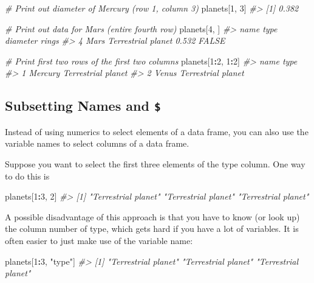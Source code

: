 \documentclass[]{book}
\newenvironment{Shaded}{\begin{snugshade}}{\end{snugshade}}
\newcommand{\CommentTok}[1]{\textcolor[rgb]{0.56,0.35,0.01}{\textit{#1}}}
\newcommand{\DecValTok}[1]{\textcolor[rgb]{0.00,0.00,0.81}{#1}}
\newcommand{\NormalTok}[1]{#1}
\newcommand{\OperatorTok}[1]{\textcolor[rgb]{0.81,0.36,0.00}{\textbf{#1}}}
\newcommand{\StringTok}[1]{\textcolor[rgb]{0.31,0.60,0.02}{#1}}
\begin{document}
\begin{Shaded}
\begin{Highlighting}[]
\CommentTok{# Print out diameter of Mercury (row 1, column 3)}
\NormalTok{planets[}\DecValTok{1}\NormalTok{, }\DecValTok{3}\NormalTok{]}
\CommentTok{#> [1] 0.382}

\CommentTok{# Print out data for Mars (entire fourth row)}
\NormalTok{planets[}\DecValTok{4}\NormalTok{, ]}
\CommentTok{#>   name               type diameter rings}
\CommentTok{#> 4 Mars Terrestrial planet    0.532 FALSE}

\CommentTok{# Print first two rows of the first two columns}
\NormalTok{planets[}\DecValTok{1}\OperatorTok{:}\DecValTok{2}\NormalTok{, }\DecValTok{1}\OperatorTok{:}\DecValTok{2}\NormalTok{]}
\CommentTok{#>      name               type}
\CommentTok{#> 1 Mercury Terrestrial planet}
\CommentTok{#> 2   Venus Terrestrial planet}
\end{Highlighting}
\end{Shaded}

\hypertarget{subsetting-names-and}{%
\subsection{\texorpdfstring{Subsetting Names and \texttt{\$}}{Subsetting Names and \$}}\label{subsetting-names-and}}

Instead of using numerics to select elements of a data frame, you can also use the variable names to select columns of a data frame.

Suppose you want to select the first three elements of the type column. One way to do this is

\begin{Shaded}
\begin{Highlighting}[]
\NormalTok{planets[}\DecValTok{1}\OperatorTok{:}\DecValTok{3}\NormalTok{, }\DecValTok{2}\NormalTok{]}
\CommentTok{#> [1] "Terrestrial planet" "Terrestrial planet" "Terrestrial planet"}
\end{Highlighting}
\end{Shaded}

A possible disadvantage of this approach is that you have to know (or look up) the column number of type, which gets hard if you have a lot of variables. It is often easier to just make use of the variable name:

\begin{Shaded}
\begin{Highlighting}[]
\NormalTok{planets[}\DecValTok{1}\OperatorTok{:}\DecValTok{3}\NormalTok{, }\StringTok{"type"}\NormalTok{]}
\CommentTok{#> [1] "Terrestrial planet" "Terrestrial planet" "Terrestrial planet"}
\end{Highlighting}
\end{Shaded}
\end{document}
